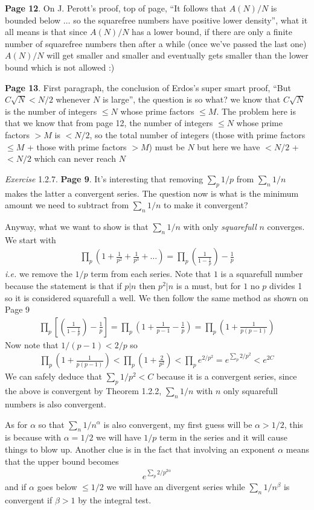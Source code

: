 \documentclass[aps,preprint,preprintnumbers,nofootinbib,showpacs,prd]{revtex4-1}
\newcommand{\ie}{{\it i.e.} }
\newcommand{\nbea}{\begin{eqnarray*}}
\newcommand{\neea}{\end{eqnarray*}}
\begin{document}
{\bf Page 12}. On J. Perott's proof, top of page, ``It follows that $A(N)/N$ is bounded below $\dots$ so the squarefree numbers have positive lower density'', what it all means is that since $A(N)/N$ has a lower bound, if there are only a finite number of squarefree numbers then after a while (once we've passed the last one) $A(N)/N$ will get smaller and smaller and eventually gets smaller than the lower bound which is not allowed :)

{\bf Page 13}. First paragraph, the conclusion of Erdos's super smart proof, ``But $C\sqrt{N} < N/2$ whenever $N$ is large'', the question is so what? we know that $C\sqrt{N}$ is the number of integers $\le N$ whose prime factors $\le M$. The problem here is that we know that from page 12, the number of integers $\le N$ whose prime factors $> M$ is $< N/2$, so the total number of integers (those with prime factors $\le M$ + those with prime factors $> M$) must be $N$ but here we have $< N/2$ + $< N/2$ which can never reach $N$



{\it Exercise} 1.2.7. {\bf Page 9}. It's interesting that removing $\sum_p 1/p$ from $\sum_n 1/n$ makes the latter a convergent series. The question now is what is the minimum amount we need to subtract from $\sum_n 1/n$ to make it convergent?

Anyway, what we want to show is that $\sum_n 1/n$ with only {\it squarefull} $n$ converges. We start with
%
\nbea
\prod_p \left( 1 + \frac{1}{p^2} + \frac{1}{p^3} + \dots\right ) = \prod_p \left (\frac{1}{1 - \frac{1}{p}} \right ) - \frac{1}{p}
\neea
%
\ie we remove the $1/p$ term from each series. Note that $1$ is a squarefull number because the statement is that if $p|n$ then $p^2|n$ is a must, but for $1$ no $p$ divides 1 so it is considered squarefull a well. We then follow the same method as shown on Page 9
%
\nbea
\prod_p \left\lbrack\left (\frac{1}{1 - \frac{1}{p}} \right ) - \frac{1}{p}\right\rbrack = \prod_p \left ( 1 + \frac{1}{p-1} - \frac{1}{p} \right ) = \prod_p \left( 1 + \frac{1}{p(p-1)}\right )
\neea
%
Now note that $1/(p-1) < 2/p$ so
%
\nbea
\prod_p \left( 1 + \frac{1}{p(p-1)}\right ) < \prod_p \left( 1 + \frac{2}{p^2}\right ) < \prod_p e^{2/p^2} = e^{\sum_{p} 2/p^2} < e^{2C}
\neea
%
We can safely deduce that $\sum_p 1/p^2 < C$ because it is a convergent series, since the above is convergent by Theorem 1.2.2, $\sum_n 1/n$ with $n$ only squarefull numbers is also convergent.

As for $\alpha$ so that $\sum_n 1/n^\alpha$ is also convergent, my first guess will be $\alpha > 1/2$, this is because with $\alpha = 1/2$ we will have $1/p$ term in the series and it will cause things to blow up. Another clue is in the fact that involving an exponent $\alpha$ means that the upper bound becomes
%
\nbea
e^{\sum_{p} 2/p^{2\alpha}}
\neea
%
and if $\alpha$ goes below $\le 1/2$ we will have an divergent series while $\sum_n 1/n^\beta$ is convergent if $\beta > 1$ by the integral test.
\end{document}
